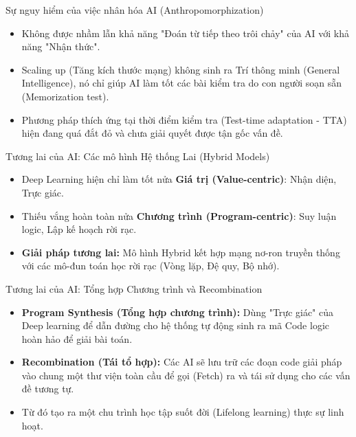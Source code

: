\documentclass[aspectratio=169]{beamer}
\begin{document}
\begin{frame}{Sự nguy hiểm của việc nhân hóa AI (Anthropomorphization)}
    \begin{itemize}
        \item Không được nhầm lẫn khả năng "Đoán từ tiếp theo trôi chảy" của AI với khả năng "Nhận thức".
        \item Scaling up (Tăng kích thước mạng) không sinh ra Trí thông minh (General Intelligence), nó chỉ giúp AI làm tốt các bài kiểm tra do con người soạn sẵn (Memorization test).
        \item Phương pháp thích ứng tại thời điểm kiểm tra (Test-time adaptation - TTA) hiện đang quá đắt đỏ và chưa giải quyết được tận gốc vấn đề.
    \end{itemize}
\end{frame}

\begin{frame}{Tương lai của AI: Các mô hình Hệ thống Lai (Hybrid Models)}
    \begin{itemize}
        \item Deep Learning hiện chỉ làm tốt nửa \textbf{Giá trị (Value-centric)}: Nhận diện, Trực giác.
        \item Thiếu vắng hoàn toàn nửa \textbf{Chương trình (Program-centric)}: Suy luận logic, Lập kế hoạch rời rạc.
        \item \textbf{Giải pháp tương lai:} Mô hình Hybrid kết hợp mạng nơ-ron truyền thống với các mô-đun toán học rời rạc (Vòng lặp, Đệ quy, Bộ nhớ).
    \end{itemize}
\end{frame}

\begin{frame}{Tương lai của AI: Tổng hợp Chương trình và Recombination}
    \begin{itemize}
        \item \textbf{Program Synthesis (Tổng hợp chương trình):} Dùng "Trực giác" của Deep learning để dẫn đường cho hệ thống tự động sinh ra mã Code logic hoàn hảo để giải bài toán.
        \item \textbf{Recombination (Tái tổ hợp):} Các AI sẽ lưu trữ các đoạn code giải pháp vào chung một thư viện toàn cầu để gọi (Fetch) ra và tái sử dụng cho các vấn đề tương tự.
        \item Từ đó tạo ra một chu trình học tập suốt đời (Lifelong learning) thực sự linh hoạt.
    \end{itemize}
\end{frame}
\end{document}
